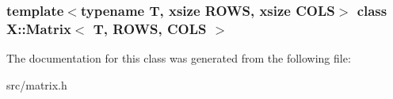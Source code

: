 \subsubsection*{template$<$typename T, xsize R\-O\-W\-S, xsize C\-O\-L\-S$>$ class X\-::\-Matrix$<$ T, R\-O\-W\-S, C\-O\-L\-S $>$}



The documentation for this class was generated from the following file\-:\begin{DoxyCompactItemize}
\item 
src/matrix.\-h\end{DoxyCompactItemize}

